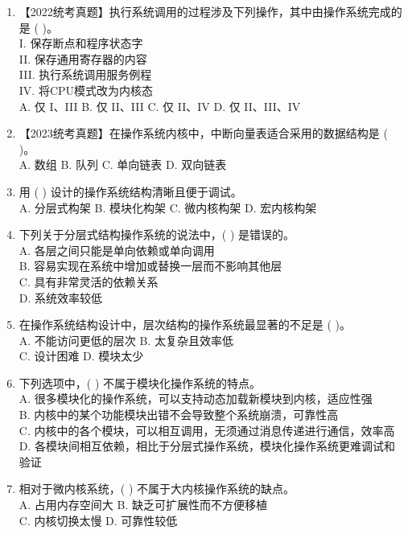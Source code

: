 \documentclass[lang=cn,newtx,10pt,scheme=chinese]{../../elegantbook}
\begin{document}
\begin{enumerate}
    \item 【2022统考真题】执行系统调用的过程涉及下列操作，其中由操作系统完成的是 (    )。\\
    I. 保存断点和程序状态字\\
    II. 保存通用寄存器的内容\\
    III. 执行系统调用服务例程\\
    IV. 将CPU模式改为内核态\\
    A. 仅 I、III \quad B. 仅 II、III \quad C. 仅 II、IV \quad D. 仅 II、III、IV

    \item 【2023统考真题】在操作系统内核中，中断向量表适合采用的数据结构是 (    )。\\
    A. 数组 \quad B. 队列 \quad C. 单向链表 \quad D. 双向链表

    \item 用 (    ) 设计的操作系统结构清晰且便于调试。\\
    A. 分层式构架 \quad B. 模块化构架 \quad C. 微内核构架 \quad D. 宏内核构架

    \item 下列关于分层式结构操作系统的说法中，(    ) 是错误的。\\
    A. 各层之间只能是单向依赖或单向调用\\
    B. 容易实现在系统中增加或替换一层而不影响其他层\\
    C. 具有非常灵活的依赖关系\\
    D. 系统效率较低

    \item 在操作系统结构设计中，层次结构的操作系统最显著的不足是 (    )。\\
    A. 不能访问更低的层次 \quad B. 太复杂且效率低\\
    C. 设计困难 \quad D. 模块太少

    \item 下列选项中，(    ) 不属于模块化操作系统的特点。\\
    A. 很多模块化的操作系统，可以支持动态加载新模块到内核，适应性强\\
    B. 内核中的某个功能模块出错不会导致整个系统崩溃，可靠性高\\
    C. 内核中的各个模块，可以相互调用，无须通过消息传递进行通信，效率高\\
    D. 各模块间相互依赖，相比于分层式操作系统，模块化操作系统更难调试和验证

    \item 相对于微内核系统，(    ) 不属于大内核操作系统的缺点。\\
    A. 占用内存空间大 \quad B. 缺乏可扩展性而不方便移植\\
    C. 内核切换太慢 \quad D. 可靠性较低


\end{enumerate}
\end{document}
